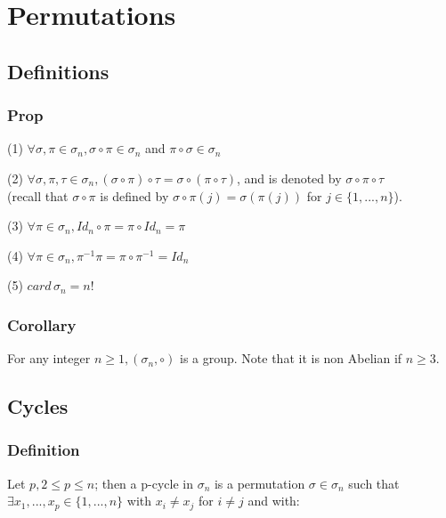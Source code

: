 \section{Permutations}

        \subsection{Definitions}
            \subsubsection{Prop}
                (1) $\forall \sigma,\pi \in \sigma_n, \sigma\circ\pi\in\sigma_n$ and $\pi\circ\sigma\in\sigma_n$

                \vspace{4pt}

                \noindent(2) $\forall \sigma,\pi,\tau\in\sigma_n, (\sigma\circ\pi)\circ\tau=\sigma\circ (\pi\circ\tau )$, and is denoted by $\sigma\circ\pi\circ\tau$ \\ (recall that $\sigma\circ\pi$ is defined by $\sigma\circ\pi (j)=\sigma (\pi (j))$ for $j\in\{1,...,n\}$).

                \vspace{4pt}

                \noindent(3) $\forall \pi\in\sigma_n, Id_n\circ\pi=\pi\circ Id_n = \pi$

                \vspace{4pt}

                \noindent(4) $\forall \pi\in\sigma_n, \pi^{-1}\pi=\pi\circ\pi^{-1}=Id_n$

                \vspace{4pt}

                \noindent(5) $card\,\sigma_n = n!$

            \subsubsection{Corollary}
                For any integer $n\geq 1, (\sigma_n, \circ)$ is a group. Note that it is non Abelian if $n \geq 3$.

        \subsection{Cycles}
            \subsubsection{Definition}
                Let $p, 2\leq p \leq n$; then a p-cycle in $\sigma_n$ is a permutation $\sigma\in\sigma_n$ such that $\exists x_1,...,x_p\in\{1,...,n\}$ with $x_i\neq x_j$ for $i\neq j$ and with:
                \vspace{4pt}

